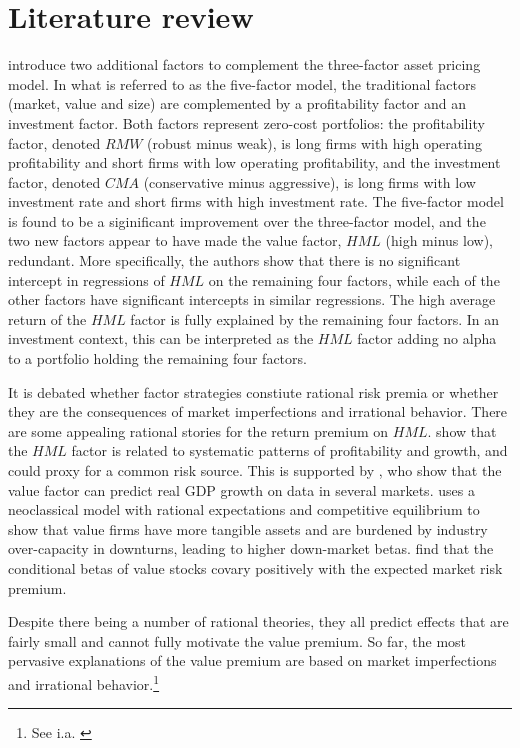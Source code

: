 \section{Literature review}
\textcite{FF2015} introduce two additional factors to complement the \textcite{FamaFrench1993} three-factor asset pricing model. In what is referred to as the five-factor model, the traditional factors (market, value and size) are complemented by a profitability factor and an investment factor. Both factors represent zero-cost portfolios: the profitability factor, denoted $RMW$ (robust minus weak), is long firms with high operating profitability and short firms with low operating profitability, and the investment factor, denoted $CMA$ (conservative minus aggressive), is long firms with low investment rate and short firms with high investment rate. The five-factor model is found to be a siginificant improvement over the three-factor model, and the two new factors appear to have made the value factor, $HML$ (high minus low), redundant. More specifically, the authors show that there is no significant intercept in regressions of $HML$ on the remaining four factors, while each of the other factors have significant intercepts in similar regressions. The high average return of the $HML$ factor is fully explained by the remaining four factors. In an investment context, this can be interpreted as the $HML$ factor adding no alpha to a portfolio holding the remaining four factors.

It is debated whether factor strategies constiute rational risk premia or whether they are the consequences of market imperfections and irrational behavior. There are some appealing rational stories for the return premium on $HML$. \textcite{FamaFrench1993} show that the $HML$ factor is related to systematic patterns of profitability and growth, and could proxy for a common risk source. This is supported by \textcite{LiewVassalou2000}, who show that the value factor can predict real GDP growth on data in several markets. \textcite{Zhang2005} uses a neoclassical model with rational expectations and competitive equilibrium to show that value firms have more tangible assets and are burdened by industry over-capacity in downturns, leading to higher down-market betas. \textcite{PetkovaZhang2005} find that the conditional betas of value stocks covary positively with the expected market risk premium.

Despite there being a number of rational theories, they all predict effects that are fairly small and cannot fully motivate the value premium. So far, the most pervasive explanations of the value premium are based on market imperfections and irrational behavior.\footnote{See i.a. \textcite{Ilmanen2011}}

